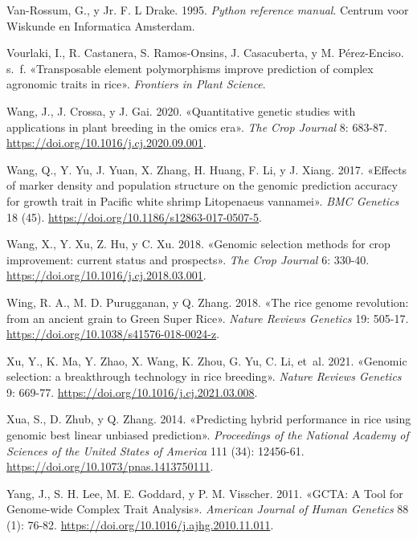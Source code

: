 \documentclass[11pt,spanish,a4paper,oneside,]{book} %
\begin{document}
\leavevmode\hypertarget{ref-cite:53}{}%
Van-Rossum, G., y Jr. F. L Drake. 1995. \emph{Python reference manual}. Centrum voor Wiskunde en Informatica Amsterdam.

\leavevmode\hypertarget{ref-cite:26}{}%
Vourlaki, I., R. Castanera, S. Ramos-Onsins, J. Casacuberta, y M. Pérez-Enciso. s.~f. «Transposable element polymorphisms improve prediction of complex agronomic traits in rice». \emph{Frontiers in Plant Science}.

\leavevmode\hypertarget{ref-cite:46}{}%
Wang, J., J. Crossa, y J. Gai. 2020. «Quantitative genetic studies with applications in plant breeding in the omics era». \emph{The Crop Journal} 8: 683-87. \url{https://doi.org/10.1016/j.cj.2020.09.001}.

\leavevmode\hypertarget{ref-cite:82}{}%
Wang, Q., Y. Yu, J. Yuan, X. Zhang, H. Huang, F. Li, y J. Xiang. 2017. «Effects of marker density and population structure on the genomic prediction accuracy for growth trait in Pacific white shrimp Litopenaeus vannamei». \emph{BMC Genetics} 18 (45). \url{https://doi.org/10.1186/s12863-017-0507-5}.

\leavevmode\hypertarget{ref-cite:77}{}%
Wang, X., Y. Xu, Z. Hu, y C. Xu. 2018. «Genomic selection methods for crop improvement: current status and prospects». \emph{The Crop Journal} 6: 330-40. \url{https://doi.org/10.1016/j.cj.2018.03.001}.

\leavevmode\hypertarget{ref-cite:55}{}%
Wing, R. A., M. D. Purugganan, y Q. Zhang. 2018. «The rice genome revolution: from an ancient grain to Green Super Rice». \emph{Nature Reviews Genetics} 19: 505-17. \url{https://doi.org/10.1038/s41576-018-0024-z}.

\leavevmode\hypertarget{ref-cite:60}{}%
Xu, Y., K. Ma, Y. Zhao, X. Wang, K. Zhou, G. Yu, C. Li, et~al. 2021. «Genomic selection: a breakthrough technology in rice breeding». \emph{Nature Reviews Genetics} 9: 669-77. \url{https://doi.org/10.1016/j.cj.2021.03.008}.

\leavevmode\hypertarget{ref-cite:25}{}%
Xua, S., D. Zhub, y Q. Zhang. 2014. «Predicting hybrid performance in rice using genomic best linear unbiased prediction». \emph{Proceedings of the National Academy of Sciences of the United States of America} 111 (34): 12456-61. \url{https://doi.org/10.1073/pnas.1413750111}.

\leavevmode\hypertarget{ref-cite:54}{}%
Yang, J., S. H. Lee, M. E. Goddard, y P. M. Visscher. 2011. «GCTA: A Tool for Genome-wide Complex Trait Analysis». \emph{American Journal of Human Genetics} 88 (1): 76-82. \url{https://doi.org/10.1016/j.ajhg.2010.11.011}.
\end{document}
